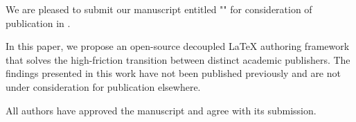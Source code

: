 \documentclass{packages/custom/cover_letter}
\begin{document}
\makeheader

We are pleased to submit our manuscript entitled "\thepapertitle" for consideration of publication in \thejournalname.

In this paper, we propose an open-source decoupled LaTeX authoring framework that solves the high-friction transition between distinct academic publishers. The findings presented in this work have not been published previously and are not under consideration for publication elsewhere.

All authors have approved the manuscript and agree with its submission.

\makeclosing
\end{document}

